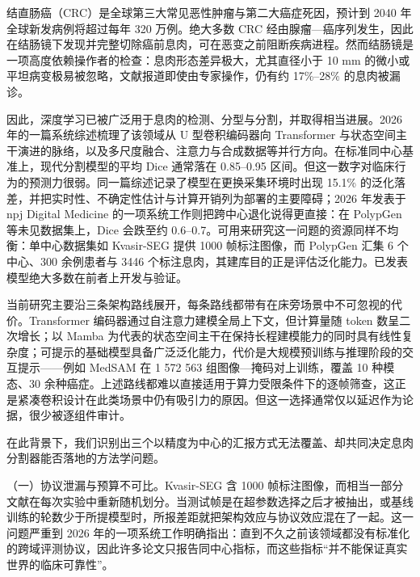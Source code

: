 \documentclass[conference]{IEEEtran}
\begin{document}
结直肠癌（CRC）是全球第三大常见恶性肿瘤与第二大癌症死因，预计到 2040 年全球新发病例将超过每年 320 万例\cite{divya2026review}。绝大多数 CRC 经由腺瘤—癌序列发生，因此在结肠镜下发现并完整切除癌前息肉，可在恶变之前阻断疾病进程\cite{divya2026review}。然而结肠镜是一项高度依赖操作者的检查：息肉形态差异极大，尤其直径小于 10 mm 的微小或平坦病变极易被忽略，文献报道即使由专家操作，仍有约 17\%–28\% 的息肉被漏诊\cite{xiao2026prysmnet}。

因此，深度学习已被广泛用于息肉的检测、分型与分割，并取得相当进展。2026 年的一篇系统综述梳理了该领域从 U 型卷积编码器向 Transformer 与状态空间主干演进的脉络，以及多尺度融合、注意力与合成数据等并行方向\cite{divya2026review}。在标准同中心基准上，现代分割模型的平均 Dice 通常落在 0.85–0.95 区间\cite{xiao2026prysmnet}。但这一数字对临床行为的预测力很弱。同一篇综述记录了模型在更换采集环境时出现 15.1\% 的泛化落差，并把实时性、不确定性估计与计算开销列为部署的主要障碍\cite{divya2026review}；2026 年发表于 npj Digital Medicine 的一项系统工作则把跨中心退化说得更直接：在 PolypGen 等未见数据集上，Dice 会跌至约 0.6–0.7\cite{xiao2026prysmnet}。可用来研究这一问题的资源同样不均衡：单中心数据集如 Kvasir-SEG 提供 1000 帧标注图像\cite{jha2020kvasir}，而 PolypGen 汇集 6 个中心、300 余例患者与 3446 个标注息肉，其建库目的正是评估泛化能力\cite{ali2023polypgen}。已发表模型绝大多数在前者上开发与验证。

当前研究主要沿三条架构路线展开，每条路线都带有在床旁场景中不可忽视的代价。Transformer 编码器通过自注意力建模全局上下文，但计算量随 token 数呈二次增长\cite{chen2021transunet}；以 Mamba 为代表的状态空间主干在保持长程建模能力的同时具有线性复杂度\cite{ruan2024vmunet}；可提示的基础模型具备广泛泛化能力，代价是大规模预训练与推理阶段的交互提示——例如 MedSAM 在 1 572 563 组图像—掩码对上训练，覆盖 10 种模态、30 余种癌症\cite{ma2024medsam}。上述路线都难以直接适用于算力受限条件下的逐帧筛查，这正是紧凑卷积设计在此类场景中仍有吸引力的原因。但这一选择通常仅以延迟作为论据，很少被逐组件审计。

在此背景下，我们识别出三个以精度为中心的汇报方式无法覆盖、却共同决定息肉分割器能否落地的方法学问题。

（一）协议泄漏与预算不可比。Kvasir-SEG 含 1000 帧标注图像\cite{jha2020kvasir}，而相当一部分文献在每次实验中重新随机划分。当测试帧是在超参数选择之后才被抽出，或基线训练的轮数少于所提模型时，所报差距就把架构效应与协议效应混在了一起。这一问题严重到 2026 年的一项系统工作明确指出：直到不久之前该领域都没有标准化的跨域评测协议，因此许多论文只报告同中心指标，而这些指标“并不能保证真实世界的临床可靠性”\cite{xiao2026prysmnet}。
\end{document}
